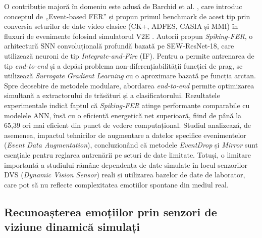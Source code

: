 O contribuție majoră în domeniu este adusă de Barchid et al. \cite{barchid2023}, care introduc conceptul de „Event-based FER” și propun primul benchmark de acest tip prin conversia seturilor de date video clasice (CK+, ADFES, CASIA și MMI) în fluxuri de evenimente folosind simulatorul V2E \cite{yuhuang2021}. Autorii propun \textit{Spiking-FER}, o arhitectură SNN convoluțională profundă bazată pe SEW-ResNet-18, care utilizează neuroni de tip \textit{Integrate-and-Fire} (IF). Pentru a permite antrenarea de tip \textit{end-to-end} și a depăși problema non-diferențiabilității funcției de prag, se utilizează \textit{Surrogate Gradient Learning} cu o aproximare bazată pe funcția arctan. Spre deosebire de metodele modulare, abordarea \textit{end-to-end} permite optimizarea simultană a extractorului de trăsături și a clasificatorului. Rezultatele experimentale indică faptul că \textit{Spiking-FER} atinge performanțe comparabile cu modelele ANN, însă cu o eficiență energetică net superioară, fiind de până la 65,39 ori mai eficient din punct de vedere computațional. Studiul analizează, de asemenea, impactul tehnicilor de augmentare a datelor specifice evenimentelor (\textit{Event Data Augmentation}), concluzionând că metodele \textit{EventDrop} și \textit{Mirror} sunt esențiale pentru reglarea antrenării pe seturi de date limitate. Totuși, o limitare importantă a studiului rămâne dependența de date simulate în locul senzorilor DVS (\textit{Dynamic Vision Sensor}) reali și utilizarea bazelor de date de laborator, care pot să nu reflecte complexitatea emoțiilor spontane din mediul real.

\subsection*{Recunoașterea emoțiilor prin senzori de viziune dinamică simulați}

